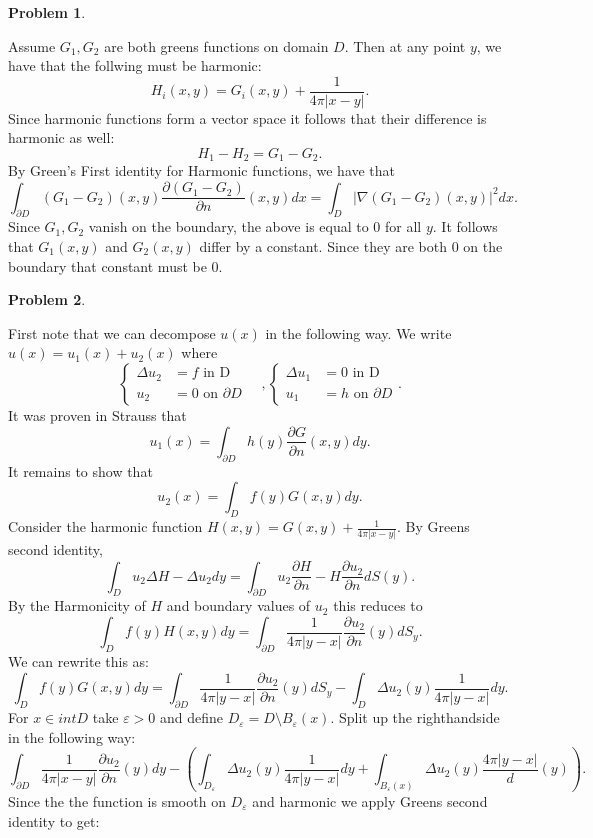 \documentclass[12pt, a4paper]{article}
\title{} \author{A.N.}
\date{\today}
\newtheorem{problem}{Problem}
\theoremstyle{definition}
\newcommand{\bd}{\partial}
\newcommand{\grad}{\nabla}
\newcommand{\ep}{\varepsilon}
\begin{document}
\begin{problem}
\end{problem}
Assume $G_1,G_2$ are both greens functions on domain $D$. Then at any point $y$, we have that the follwing must be harmonic: 
$$H_i(x,y) =G_i(x,y) + \frac{1}{4\pi |x-y|}. $$
Since harmonic functions form a vector space it follows that their difference is harmonic as well:
$$H_1 - H_2 = G_1 - G_2. $$
By Green's First identity for Harmonic functions, we have that 
$$\int_{\bd D} (G_1 - G_2)(x,y) \frac{\partial ( G_1 - G_2)}{\partial n}(x,y) dx = \int_D |\grad(G_1 - G_2)(x,y)|^2dx.$$
Since $G_1,G_2$ vanish on the boundary, the above is equal to 0 for all $y$. It follows that $G_1(x,y)$ and $G_2(x,y)$ differ by a constant. Since they are both $0$ on the boundary that constant must be 0. 
\newpage
\begin{problem}
\end{problem}
First note that we can decompose $u(x)$ in the following way. We write $u(x) = u_1(x) + u_2(x)$ where 
$$\begin{cases} \Delta u_2& = f \text{ in D}
	\\ u_2& = 0 \text{ on $\bd D$}
\end{cases} \quad,
\begin{cases}
	\Delta u_1 &= 0 \text{ in D}
	\\ u_1& = h \text{ on $\bd D$} 
\end{cases}.$$
It was proven in Strauss that 
$$u_1(x) = \int_{\bd D} h(y) \frac{\partial G}{\partial n} (x,y) dy.$$
It remains to show that 
$$u_2(x) = \int_D f(y) G(x,y) dy.$$
Consider the harmonic function $H(x,y) = G(x,y) + \frac{1}{4\pi |x-y|}$. By Greens second identity, 
$$\int_D u_2 \Delta H - \Delta u_2 dy = \int_{\bd D} u_2 \frac{\partial H}{\partial n} - H \frac{\partial u_2}{\partial n} dS(y).$$
By the Harmonicity of $H$ and boundary values of $u_2$ this reduces to 
$$\int_D f(y) H(x,y) dy = \int_{\bd D} \frac{1}{4\pi |y-x|}\frac{\partial u_2}{\partial n}(y) dS_y.$$
We can rewrite this as: 
$$\int_D f(y)G (x,y) dy = \int_{\bd D} \frac{1}{4\pi |y-x|} \frac{\partial u_2}{\partial n} (y) dS_y - \int_{D} \Delta u_2(y) \frac{1}{4\pi |y-x|} dy.$$
For $x\in int D$ take $\ep>0$ and define $D_\ep = D \setminus B_\ep(x)$. Split up the righthandside in the following way: 
$$\int_{\bd D } \frac{1}{4\pi |x-y|} \frac{\partial u_2}{\partial n} (y) dy - \left(\int_{D_\ep} \Delta u_2(y) \frac{1}{4\pi |y-x|} dy + \int_{B_\ep(x)}\Delta u_2(y) \frac{4\pi |y-x|} d(y) \right).$$
Since the the function is smooth on $D_\ep$  and harmonic we apply Greens second identity to get: 
\end{document}
